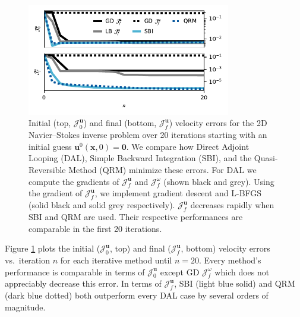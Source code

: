 \documentclass[%
 reprint,
 amsmath,amssymb,
 aps,
 pre,
]{revtex4-2}
\renewcommand{\vec}[1]{\boldsymbol{#1}}
\newcommand{\JUo}{\mathcal{J}^{\vec{u}}_0}
\newcommand{\JUf}{\mathcal{J}^{\vec{u}}_f}
\newcommand{\Jwf}{\mathcal{J}^{\omega}_f}
\begin{document}
\begin{figure}
  \centering
  \includegraphics[width=3.5in]{PLT20DQ/both.pdf}
  \caption{Initial (top, $\JUo$) and final (bottom, $\JUf$) velocity errors for the 2D Navier--Stokes inverse problem over 20 iterations starting with an initial guess $\vec{u}^0(\vec{x}, 0)=\vec{0}$. 
  We compare how Direct Adjoint Looping (DAL), Simple Backward Integration (SBI), and the Quasi-Reversible Method (QRM) minimize these errors. 
  For DAL we compute the gradients of $\JUf$ and $\Jwf$ (shown black and grey).
  Using the gradient of $\JUf$, we implement gradient descent and L-BFGS (solid black and solid grey respectively). 
  $\JUf$ decreases rapidly when SBI and QRM are used. 
  Their respective performances are comparable in the first 20 iterations.
  }
  \label{shearstudyq}
\end{figure}

Figure \ref{shearstudyq} plots the initial ($\JUo$, top) and final ($\JUf$, bottom) velocity errors vs.~iteration $n$ for each iterative method until $n=20$.
Every method's performance is comparable in terms of $\JUo$ except GD $\Jwf$ which does not appreciably decrease this error.
In terms of $\JUf$, SBI (light blue solid) and QRM (dark blue dotted) both outperform every DAL case by several orders of magnitude.  
\end{document}
